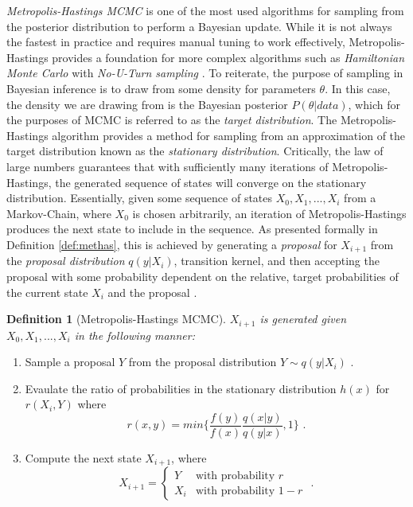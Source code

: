 \documentclass[
  12pt,
]{book}
\theoremstyle{definition}
\newtheorem{definition}{Definition}[chapter]
\theoremstyle{definition}
\theoremstyle{definition}
\theoremstyle{remark}
\begin{document}
\emph{Metropolis-Hastings MCMC} is one of the most used algorithms for sampling from the posterior distribution to perform a Bayesian update.
While it is not always the fastest in practice and requires manual tuning to work effectively, Metropolis-Hastings provides a foundation for more complex algorithms such as \emph{Hamiltonian Monte Carlo} \citep{Brooks2011} with \emph{No-U-Turn sampling} \citep{Homan2014}.
To reiterate, the purpose of sampling in Bayesian inference is to draw from some density for parameters \(\theta\).
In this case, the density we are drawing from is the Bayesian posterior \(P(\theta|data)\), which for the purposes of MCMC is referred to as the \emph{target distribution}.
The Metropolis-Hastings algorithm provides a method for sampling from an approximation of the target distribution known as the \emph{stationary distribution}.
Critically, the law of large numbers guarantees that with sufficiently many iterations of Metropolis-Hastings, the generated sequence of states will converge on the stationary distribution.
Essentially, given some sequence of states \(X_{0},X_{1},...,X_{i}\) from a Markov-Chain, where \(X_{0}\) is chosen arbitrarily, an iteration of Metropolis-Hastings produces the next state to include in the sequence.
As presented formally in Definition \ref{def:methas}, this is achieved by generating a \emph{proposal} for \(X_{i+1}\) from the \emph{proposal distribution} \(q(y|X_{i})\), transition kernel, and then accepting the proposal with some probability dependent on the relative, target probabilities of the current state \(X_{i}\) and the proposal \citep{Wasserman2004}.

\begin{definition}[Metropolis-Hastings MCMC]
\protect\hypertarget{def:methas}{}{\label{def:methas} {} }\emph{\(X_{i+1}\) is generated given \(X_{0},X_{1},...,X_{i}\) in the following manner:}

\begin{enumerate}
  \item Sample a proposal $Y$ from the proposal distribution $Y \sim q(y|X_{i}) \textrm{ .}$
  \item Evaulate the ratio of probabilities in the stationary distribution $h(x)$ for $r(X_{i},Y)$ where $$ r(x,y)=min \{\frac{f(y)}{f(x)} \frac{q(x|y)}{q(y|x)} ,1 \} \textrm{ .}$$
  \item Compute the next state $X_{i+1}$, where $$X_{i+1}=\begin{cases}Y & \textrm{with probability }r \\ X_{i} & \textrm{with probability }1-r \end{cases} \textrm{ .}$$
\end{enumerate}
\end{definition}
\end{document}
